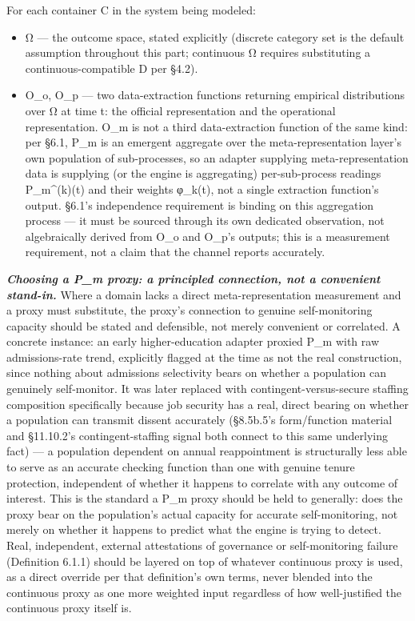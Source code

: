 \documentclass[
]{article}
\begin{document}
For each container C in the system being modeled:

\begin{itemize}
\item
  Ω --- the outcome space, stated explicitly (discrete category set is
  the default assumption throughout this part; continuous Ω requires
  substituting a continuous-compatible D per §4.2).
\item
  O\_o, O\_p --- two data-extraction functions returning empirical
  distributions over Ω at time t: the official representation and the
  operational representation. O\_m is not a third data-extraction
  function of the same kind: per §6.1, P\_m is an emergent aggregate
  over the meta-representation layer's own population of sub-processes,
  so an adapter supplying meta-representation data is supplying (or the
  engine is aggregating) per-sub-process readings P\_m\^{}(k)(t) and
  their weights φ\_k(t), not a single extraction function's output.
  §6.1's independence requirement is binding on this aggregation process
  --- it must be sourced through its own dedicated observation, not
  algebraically derived from O\_o and O\_p's outputs; this is a
  measurement requirement, not a claim that the channel reports
  accurately.
\end{itemize}

\emph{\textbf{Choosing a P\_m proxy: a principled connection, not a
convenient stand-in.}} Where a domain lacks a direct meta-representation
measurement and a proxy must substitute, the proxy's connection to
genuine self-monitoring capacity should be stated and defensible, not
merely convenient or correlated. A concrete instance: an early
higher-education adapter proxied P\_m with raw admissions-rate trend,
explicitly flagged at the time as not the real construction, since
nothing about admissions selectivity bears on whether a population can
genuinely self-monitor. It was later replaced with
contingent-versus-secure staffing composition specifically because job
security has a real, direct bearing on whether a population can transmit
dissent accurately (§8.5b.5's form/function material and §11.10.2's
contingent-staffing signal both connect to this same underlying fact)
--- a population dependent on annual reappointment is structurally less
able to serve as an accurate checking function than one with genuine
tenure protection, independent of whether it happens to correlate with
any outcome of interest. This is the standard a P\_m proxy should be
held to generally: does the proxy bear on the population's actual
capacity for accurate self-monitoring, not merely on whether it happens
to predict what the engine is trying to detect. Real, independent,
external attestations of governance or self-monitoring failure
(Definition 6.1.1) should be layered on top of whatever continuous proxy
is used, as a direct override per that definition's own terms, never
blended into the continuous proxy as one more weighted input regardless
of how well-justified the continuous proxy itself is.
\end{document}

